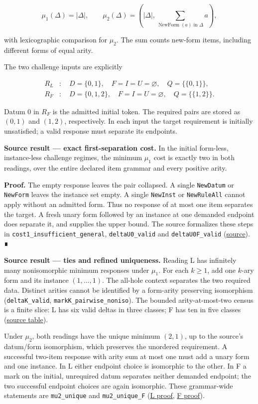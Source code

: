 \documentclass[
  11pt,
]{article}
\begin{document}
\[
\mu_1(\Delta)=|\Delta|,\qquad
\mu_2(\Delta)=\left(|\Delta|,
  \sum_{\operatorname{NewForm}(a)\text{ in }\Delta}a\right),
\]

with lexicographic comparison for \(\mu_2\). The sum counts new-form
items, including different forms of equal arity.

The two challenge inputs are explicitly

\[
\begin{aligned}
R_L&:\quad D=\{0,1\},\quad F=I=U=\varnothing,
       \quad Q=\{\{0,1\}\},\\
R_F&:\quad D=\{0,1,2\},\quad F=I=U=\varnothing,
       \quad Q=\{\{1,2\}\}.
\end{aligned}
\]

Datum \(0\) in \(R_F\) is the admitted initial token. The required pairs
are stored as \((0,1)\) and \((1,2)\), respectively. In each input the
target requirement is initially unsatisfied; a valid response must
separate its endpoints.

\textbf{Source result --- exact first-separation cost.} In the initial
form-less, instance-less challenge regimes, the minimum \(\mu_1\) cost
is exactly two in both readings, over the entire declared item grammar
and every positive arity.

\textbf{Proof.} The empty response leaves the pair collapsed. A single
\nolinkurl{NewDatum} or \nolinkurl{NewForm} leaves the instance set empty. A
single \nolinkurl{NewInst} or \nolinkurl{NewRuleAll} cannot apply without an
admitted form. Thus no response of at most one item separates the
target. A fresh unary form followed by an instance at one demanded
endpoint does separate it, and supplies the upper bound. The source
formalizes these steps in \nolinkurl{cost1_insufficient_general},
\nolinkurl{deltaU0_valid} and \nolinkurl{deltaU0F_valid}
(\href{lean4/Derivation/Minimality.lean\#L102}{source}). ∎

\textbf{Source result --- ties and refined uniqueness.} Reading L has
infinitely many nonisomorphic minimum responses under \(\mu_1\). For
each \(k\ge1\), add one \(k\)-ary form and its instance
\((1,\ldots,1)\). The all-hole context separates the two required data.
Distinct arities cannot be identified by a form-arity preserving
isomorphism (\nolinkurl{deltaK_valid}, \nolinkurl{markK_pairwise_noniso}).
The bounded arity-at-most-two census is a finite slice: L has six valid
deltas in three classes; F has ten in five classes
(\href{docs/sources/genesis_source.txt\#L308}{source table}).

Under \(\mu_2\), both readings have the unique minimum \((2,1)\), up to
the source's datum/form isomorphism, which preserves the unordered
requirement. A successful two-item response with arity sum at most one
must add a unary form and one instance. In L either endpoint choice is
isomorphic to the other. In F a mark on the initial, unrequired datum
separates neither demanded endpoint; the two successful endpoint choices
are again isomorphic. These grammar-wide statements are
\nolinkurl{mu2_unique} and \nolinkurl{mu2_unique_F}
(\href{lean4/Derivation/Minimality.lean\#L102}{L proof},
\href{lean4/Derivation/MinimalityF.lean\#L86}{F proof}).
\end{document}
